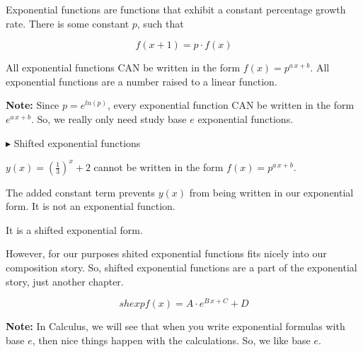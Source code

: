 \documentclass{ximera}
\begin{document}
\begin{warning}

Exponential functions are functions that exhibit a constant percentage growth rate.  There is some constant $p$, such that

\[
f(x+1) = p \cdot f(x)
\]


All exponential functions CAN be written in the form $f(x) = p^{a \, x + b}$.  All exponential functions are a number raised to a linear function.  


\textbf{Note:} Since $p = e^{ln(p)}$, every exponential function CAN be written in the form $e^{a \, x + b}$.  So, we really only need study base $e$ exponential functions.


$\blacktriangleright$ Shifted exponential functions


$y(x) = \left(\frac{1}{3}\right)^x + 2$ cannot be written in the form $f(x) = p^{a \, x + b}$. 


The added constant term prevents $y(x)$ from being written in our exponential form.  It is not an exponential function. 

It is a shifted exponential form. 


However, for our purposes shited exponential functions fits nicely into our composition story.  So, shifted exponential functions are a part of the exponential story, just another chapter. 

\[
shexpf(x) = A \cdot e^{B \, x + C} + D
\]



\end{warning}



\textbf{Note:} In Calculus, we will see that when you write exponential formulas with base $e$, then nice things happen with the calculations.  So, we like base $e$. 
\end{document}
